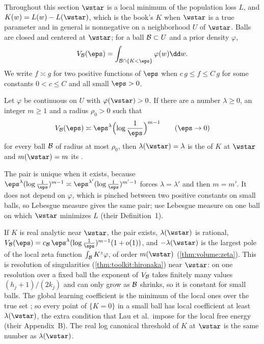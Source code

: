 \begin{refsection}
Throughout this section $\wstar$ is a local minimum of the population loss $L$, and $K(w)=L(w)-L(\wstar)$, which is the book's $K$ when $\wstar$ is a true parameter and in general is nonnegative on a neighborhood $U$ of $\wstar$. Balls are closed and centered at $\wstar$; for a ball $\mathcal{B}\subset U$ and a prior density $\varphi$,
\[
V_{\llcB}(\eps)=\int_{\llcB\cap\{K<\eps\}}\varphi(w)\dd w .
\]
We write $f\asymp g$ for two positive functions of $\eps$ when $c\,g\le f\le C\,g$ for some constants $0<c\le C$ and all small $\eps>0$.

\begin{definition}\label{def:llc:llc}
Let $\varphi$ be continuous on $U$ with $\varphi(\wstar)>0$. If there are a number $\lambda\ge0$, an integer $m\ge1$ and a radius $\rho_0>0$ such that
\[
V_{\llcB}(\eps)\asymp\eps^{\lambda}\Bigl(\log\frac1\eps\Bigr)^{m-1}\qquad(\eps\to0)
\]
for every ball $\mathcal{B}$ of radius at most $\rho_0$, then $\lambda(\wstar)=\lambda$ is the  of $K$ at $\wstar$ and $m(\wstar)=m$ its .
\end{definition}

The pair is unique when it exists, because $\eps^{\lambda}(\log\frac1\eps)^{m-1}\asymp\eps^{\lambda'}(\log\frac1\eps)^{m'-1}$ forces $\lambda=\lambda'$ and then $m=m'$. It does not depend on $\varphi$, which is pinched between two positive constants on small balls, so Lebesgue measure gives the same pair; \textcite{LauEtAl2025} use Lebesgue measure on one ball on which $\wstar$ minimizes $L$ (their Definition~1).

\begin{remark}\label{rem:llc:analytic}
If $K$ is real analytic near $\wstar$, the pair exists, $\lambda(\wstar)$ is rational, $V_{\llcB}(\eps)=c_{\llcB}\,\eps^{\lambda}(\log\frac1\eps)^{m-1}(1+o(1))$, and $-\lambda(\wstar)$ is the largest pole of the local zeta function $\int_{\mathcal{B}}K^z\varphi$, of order $m(\wstar)$ (\cref{thm:volume:zeta}). This is resolution of singularities (\cref{thm:toolkit:hironaka}) near $\wstar$: on one resolution over a fixed ball the exponent of $V_{\mathcal{B}}$ takes finitely many values $(h_j+1)/(2k_j)$ and can only grow as $\mathcal{B}$ shrinks, so it is constant for small balls. The global learning coefficient is the minimum of the local ones over the true set \parencite[Proposition~2.5]{Lin2017}; so every point of $\{K=0\}$ in a small ball has local coefficient at least $\lambda(\wstar)$, the extra condition that Lau et al.\ impose for the local free energy (their Appendix~B). The real log canonical threshold of $K$ at $\wstar$ is the same number as $\lambda(\wstar)$.
\end{remark}


\end{refsection}
